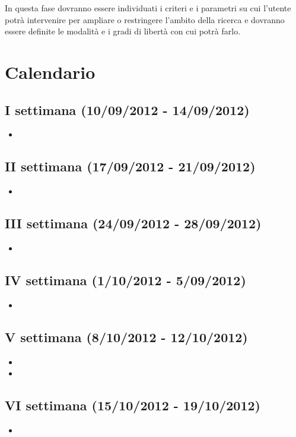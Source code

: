 \documentclass[10pt,a4paper,hidelinks]{scrartcl} %
\begin{document}
	In questa fase dovranno essere individuati i criteri e i parametri su cui l'utente potrà intervenire per ampliare o restringere l'ambito della ricerca e dovranno essere definite le modalità e i gradi di libertà con cui potrà farlo.

	\newpage
	\section{Calendario}
	
	\subsection*{I settimana (10/09/2012 - 14/09/2012)}
	\begin{itemize}
	\item {}
	\end{itemize}
	\subsection*{II settimana (17/09/2012 - 21/09/2012)}
	\begin{itemize}
	\item {}
	\end{itemize}
	\subsection*{III settimana (24/09/2012 - 28/09/2012)}
	\begin{itemize}
	\item {}
	\end{itemize}
	\subsection*{IV settimana (1/10/2012 - 5/09/2012)}
	\begin{itemize}
	\item {}
	\end{itemize}
	\subsection*{V settimana (8/10/2012 - 12/10/2012)}
	\begin{itemize}
	\item {}
	\item {}
	\end{itemize}
	\subsection*{VI settimana (15/10/2012 - 19/10/2012)}
	\begin{itemize}
	\item {}
	\end{itemize}
\end{document}
